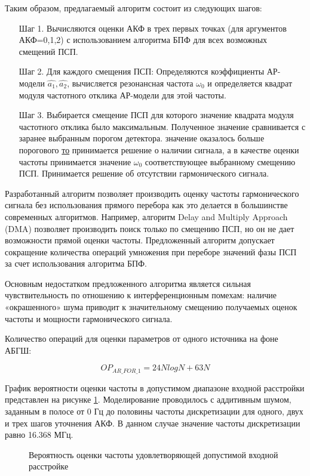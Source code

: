 Таким образом, предлагаемый алгоритм состоит из следующих шагов:

\begin{itemize}
\item[Шаг 1.] Вычисляются оценки  АКФ в трех первых точках (для аргументов АКФ=0,1,2)
	с использованием алгоритма БПФ для всех возможных смещений ПСП. 
\item[Шаг 2.] Для каждого смещения ПСП: 
	Определяются коэффициенты АР-модели ${\hat{a_1}, \hat{a_2}}$,
	вычисляется резонансная частота ${\omega_0}$
	и определяется квадрат модуля частотного отклика АР-модели для этой частоты. 
\item[Шаг 3.] Выбирается смещение ПСП для которого значение квадрата модуля частотного отклика было максимальным. Полученное значение сравнивается с заранее выбранным порогом детектора. 
	  значение оказалось больше порогового {\underline{то}} 
		принимается решение о наличии сигнала, а в качестве оценки
		частоты принимается значение ${\omega_0}$ соответствующее выбранному смещению ПСП. 
		Принимается решение об отсутствии гармонического сигнала.
\end{itemize}

Разработанный алгоритм позволяет производить оценку частоты гармонического сигнала без использования прямого перебора как это делается в большинстве современных алгоритмов.
Например, алгоритм Delay and Multiply Approach (DMA) позволяет производить поиск только по смещению ПСП,
но он не дает возможности прямой оценки частоты. 
Предложенный алгоритм допускает сокращение количества операций умножения при переборе значений фазы ПСП за счет использования алгоритма БПФ.

Основным недостатком предложенного алгоритма является сильная чувствительность по отношению к интерференционным помехам: наличие «окрашенного» шума приводит к
значительному смещению получаемых оценок частоты и мощности гармонического сигнала.

Количество операций для оценки параметров от одного источника на фоне АБГШ:
\begin{center}
\begin{equation}
	OP_{AR\_FOR\_1} = 24NlogN + 63N
\end{equation}
\end{center}

График вероятности оценки частоты в допустимом диапазоне входной расстройки представлен на рисунке
\ref{pic:lpc_for_1_probability}. Моделирование проводилось с аддитивным шумом, заданным в полосе от 0 Гц до
половины частоты дискретизации для одного, двух и трех шагов уточнения АКФ. В данном случае значение частоты дискретизации равно 16.368 МГц.
\begin{figure}[H]
\center{}
	\caption{Вероятность оценки частоты удовлетворяющей допустимой входной расстройке}
	\label{pic:lpc_for_1_probability}
\end{figure}

